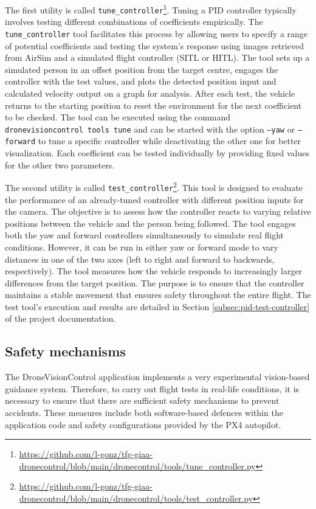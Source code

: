 The first utility is called \texttt{tune\_controller}\footnote{\url{https://github.com/l-gonz/tfg-giaa-dronecontrol/blob/main/dronecontrol/tools/tune_controller.py}}. Tuning a PID controller typically involves testing different combinations of coefficients empirically. The \texttt{tune\_controller} tool facilitates this process by allowing users to specify a range of potential coefficients and testing the system's response using images retrieved from AirSim and a simulated flight controller (SITL or HITL). The tool sets up a simulated person in an offset position from the target centre, engages the controller with the test values, and plots the detected position input and calculated velocity output on a graph for analysis. After each test, the vehicle returns to the starting position to reset the environment for the next coefficient to be checked. The tool can be executed using the command \texttt{dronevisioncontrol tools tune} and can be started with the option \texttt{--yaw} or \texttt{--forward} to tune a specific controller while deactivating the other one for better visualization. Each coefficient can be tested individually by providing fixed values for the other two parameters.

The second utility is called \texttt{test\_controller}\footnote{\url{https://github.com/l-gonz/tfg-giaa-dronecontrol/blob/main/dronecontrol/tools/test_controller.py}}. This tool is designed to evaluate the performance of an already-tuned controller with different position inputs for the camera. The objective is to assess how the controller reacts to varying relative positions between the vehicle and the person being followed. The tool engages both the yaw and forward controllers simultaneously to simulate real flight conditions. However, it can be run in either yaw or forward mode to vary distances in one of the two axes (left to right and forward to backwards, respectively). The tool measures how the vehicle responds to increasingly larger differences from the target position. The purpose is to ensure that the controller maintains a stable movement that ensures safety throughout the entire flight. The test tool's execution and results are detailed in Section \ref{subsec:pid-test-controller} of the project documentation.

\subsection{Safety mechanisms}
\label{subsec:safety}

The DroneVisionControl application implements a very experimental vision-based guidance system.
Therefore, to carry out flight tests in real-life conditions, it is necessary to ensure that there are sufficient safety mechanisms to prevent accidents.
These measures include both software-based defences within the application code and safety configurations provided by the PX4 autopilot.

